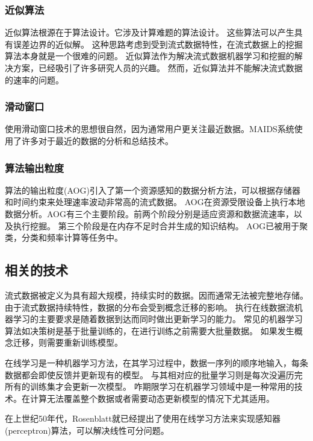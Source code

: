 \subsubsection{近似算法}

近似算法\cite{muthukrishnan2005data}根源在于算法设计。它涉及计算难题的算法设计。 这些算法可以产生具有误差边界的近似解。
这种思路考虑到受到流式数据特性，在流式数据上的挖掘算法本身就是一个很难的问题。
近似算法作为解决流式数据机器学习和挖掘的解决方案，已经吸引了许多研究人员的兴趣\cite{cormode2005s}。
然而，近似算法并不能解决流式数据的速率的问题。

\subsubsection{滑动窗口}
使用滑动窗口技术的思想很自然，因为通常用户更关注最近数据。MAIDS\cite{dong2003online}系统使用了许多对于最近的数据的分析和总结技术。

\subsubsection{算法输出粒度}
算法的输出粒度(AOG)\cite{gaber2005board, gaber2004cost, gaber2004towards}引入了第一个资源感知的数据分析方法，可以根据存储器和时间约束来处理速率波动非常高的流式数据。
AOG在资源受限设备上执行本地数据分析。AOG有三个主要阶段。前两个阶段分别是适应资源和数据流速率，以及执行挖掘。
第三个阶段是在内存不足时合并生成的知识结构。 AOG已被用于聚类，分类和频率计算等任务中\cite{gaber2005board}。

\subsection{相关的技术}
流式数据被定义为具有超大规模，持续实时的数据。因而通常无法被完整地存储。
由于流式数据持续特性，数据的分布会受到概念迁移的影响\cite{minku2011online}。
执行在线数据流机器学习的主要要求是随着数据到达而同时做出更新学习的能力。
常见的机器学习算法如决策树是基于批量训练的，在进行训练之前需要大批量数据。
如果发生概念迁移，则需要重新训练模型\cite{zliobaite2011moa}。

在线学习是一种机器学习方法，在其学习过程中，数据一序列的顺序地输入，每条数据都会即使反馈并更新现有的模型。
与其相对应的批量学习则是每次没遍历完所有的训练集才会更新一次模型。
咋期限学习在机器学习领域中是一种常用的技术。在计算无法覆盖整个数据或者需要动态更新模型的情况下尤其适用。

在上世纪50年代，Rosenblatt\cite{rosenblatt1958perceptron}就已经提出了使用在线学习方法来实现感知器(perceptron)算法，可以解决线性可分问题。

